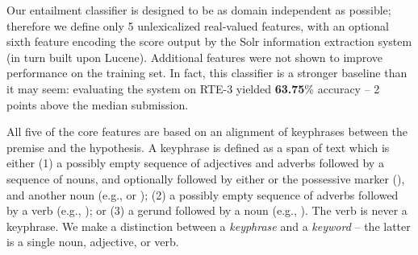 %
%
Our entailment classifier is designed to be as domain independent as possible;
  therefore we define only 5 unlexicalized real-valued features, with an 
  optional sixth feature encoding the score output by the Solr
  information extraction system (in turn built upon Lucene).
Additional features were not shown to improve performance on the training set.
In fact, this classifier is a stronger baseline than it may seem: evaluating
  the system on RTE-3 \cite{key:2007giampiccolo-rte} yielded \textbf{63.75}\% accuracy --
  2 points above the median submission.

All five of the core features are based on an alignment of keyphrases between the
  premise and the hypothesis.
A keyphrase is defined as a span of text which is either
  (1) a possibly empty sequence of adjectives and adverbs followed by a 
      sequence of nouns, and optionally followed by either  or the possessive
      marker (), and another noun (e.g.,  or );
  (2) a possibly empty sequence of adverbs followed by a verb (e.g.,
      ); or
  (3) a gerund followed by a noun (e.g., ).
The verb  is never a keyphrase.
We make a distinction between a \textit{keyphrase} and a \textit{keyword} --
  the latter is a single noun, adjective, or verb.

